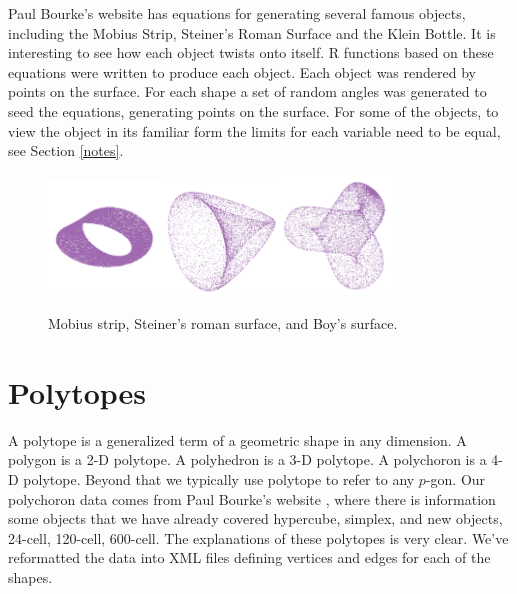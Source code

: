 \documentclass[article]{jss}
\begin{document}
Paul Bourke's website \citep{PBCurves} has equations for generating
several famous objects, including the Mobius Strip, Steiner's Roman
Surface and the Klein Bottle. It is interesting to see how each object
twists onto itself.  R functions based on these equations were written
to produce each object.  Each object was rendered by points on the
surface. For each shape a set of random angles was generated to seed
the equations, generating points on the surface.  For some of the
objects, to view the object in its familiar form the limits for each
variable need to be equal, see Section \ref{notes}.

\begin{figure}[ht]
\centerline{
\includegraphics[width=1.2in]{mobius.pdf}\includegraphics[width=1.2in]{roman.pdf}\includegraphics[width=1.2in]{boy-surface.pdf}}
\caption{Mobius strip, Steiner's roman surface, and Boy's surface.}
\end{figure}

\section{Polytopes}

A polytope is a generalized term of a geometric shape in any
dimension. A polygon is a 2-D polytope. A polyhedron is a 3-D
polytope. A polychoron is a 4-D polytope. Beyond that we typically use
polytope to refer to any $p$-gon.  Our polychoron data comes from Paul
Bourke's website \citep{PBPlatonic}, where there is information some
objects that we have already covered hypercube, simplex, and new
objects, 24-cell, 120-cell, 600-cell.  The explanations of these
polytopes is very clear. We've reformatted the data into XML files
defining vertices and edges for each of the shapes.
\end{document}
